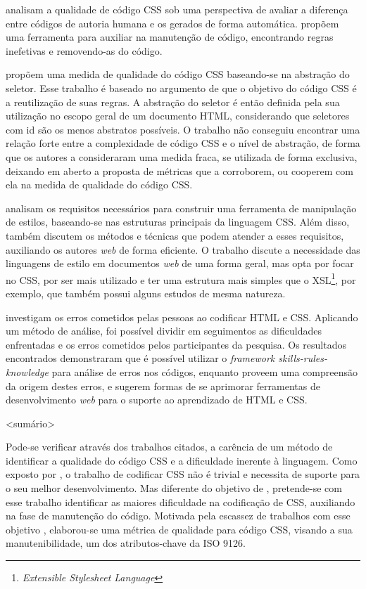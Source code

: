  analisam a qualidade de código CSS sob uma perspectiva de avaliar a diferença entre códigos de autoria humana e os gerados de forma automática.  propõem uma ferramenta para auxiliar na manutenção de código, encontrando regras inefetivas e removendo-as do código.

 propõem uma medida de qualidade do código CSS baseando-se na abstração do seletor. Esse trabalho é baseado no argumento de que o objetivo do código CSS é a reutilização de suas regras. A abstração do seletor é então definida pela sua utilização no escopo geral de um documento HTML, considerando que seletores com id são os menos abstratos possíveis. O trabalho não conseguiu encontrar uma relação forte entre a complexidade de código CSS e o nível de abstração, de forma que os autores a consideraram uma medida fraca, se utilizada de forma exclusiva, deixando em aberto a proposta de métricas que a corroborem, ou cooperem com ela na medida de qualidade do código CSS.

 analisam os requisitos necessários para construir uma ferramenta de manipulação de estilos, baseando-se nas estruturas principais da linguagem CSS. Além disso, também discutem os métodos e técnicas que podem atender a esses requisitos, auxiliando os autores \textit{web} de forma eficiente. O trabalho discute a necessidade das linguagens de estilo em documentos \textit{web} de uma forma geral, mas opta por focar no CSS, por ser mais utilizado e ter uma estrutura mais simples que o XSL\footnote{\textit{Extensible Stylesheet Language}}, por exemplo, que também possui alguns estudos de mesma natureza.

 investigam os erros cometidos pelas pessoas ao codificar HTML e CSS. Aplicando um método de análise, foi possível dividir em seguimentos as dificuldades enfrentadas e os erros cometidos pelos participantes da pesquisa. Os resultados encontrados demonstraram que é possível utilizar o \textit{framework skills-rules-knowledge} para análise de erros nos códigos, enquanto proveem uma compreensão da origem destes erros, e sugerem formas de se aprimorar ferramentas de desenvolvimento \textit{web} para o suporte ao aprendizado de HTML e CSS.

<sumário>

Pode-se verificar através dos trabalhos citados, a carência de um método de identificar a qualidade do código CSS e a dificuldade inerente à linguagem. Como exposto por , o trabalho de codificar CSS não é trivial e necessita de suporte para o seu melhor desenvolvimento. Mas diferente do objetivo de , pretende-se com esse trabalho identificar as maiores dificuldade na codificação de CSS, auxiliando na fase de manutenção do código. Motivada pela escassez de trabalhos com esse objetivo \cite{Mesbah2012}, elaborou-se uma métrica de qualidade para código CSS, visando a sua manutenibilidade, um dos atributos-chave da ISO 9126.